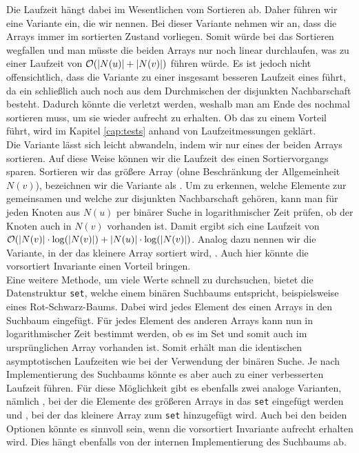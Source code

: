 Die Laufzeit hängt dabei im Wesentlichen vom Sortieren ab. Daher führen wir eine Variante ein, 
die wir  nennen. Bei dieser Variante nehmen wir an, dass
die Arrays immer im sortierten Zustand vorliegen. Somit würde bei \SorSor{} das Sortieren wegfallen
und man müsste die beiden Arrays nur noch linear durchlaufen, was zu einer Laufzeit von $\mathcal{O}(|N(u)| + |N(v)|)$
führen würde. 
Es ist jedoch nicht offensichtlich, dass die Variante zu einer insgesamt besseren Laufzeit eines
 führt, da ein \ct{} schließlich auch noch aus dem Durchmischen der disjunkten Nachbarschaft besteht.
Dadurch könnte die  verletzt werden, weshalb man am Ende des  nochmal sortieren
muss, um sie wieder aufrecht zu erhalten. Ob das  zu einem Vorteil führt, wird im Kapitel 
\ref{cap:tests} anhand von Laufzeitmessungen geklärt.
\\

Die Variante \SorSor{} lässt sich leicht abwandeln, indem wir nur eines der beiden Arrays sortieren.
Auf diese Weise können wir die Laufzeit des einen Sortiervorgangs sparen. Sortieren
wir das größere Array (ohne Beschränkung der Allgemeinheit $N(v)$), bezeichnen wir die Variante als \SorSea{}. Um zu erkennen, 
welche Elemente zur gemeinsamen und welche zur disjunkten Nachbarschaft gehören, kann man für jeden
Knoten aus $N(u)$ per binärer Suche in logarithmischer Zeit prüfen, ob der Knoten auch in $N(v)$ vorhanden ist.
Damit ergibt sich eine Laufzeit von $\mathcal{O}(|N(v)| \cdot \log(|N(v)|) + |N(u)| \cdot \log(|N(v)|)$. Analog dazu
nennen wir die Variante, in der das kleinere Array sortiert wird, \SeaSor. 
Auch hier könnte die vorsortiert Invariante einen Vorteil bringen.
\\

Eine weitere Methode, um viele Werte schnell zu durchsuchen, bietet die Datenstruktur \texttt{set}, welche
einem binären Suchbaums entspricht, beispielsweise eines Rot-Schwarz-Baums.
Dabei wird jedes Element des einen Arrays in den Suchbaum eingefügt. 
Für jedes Element des anderen Arrays kann nun in logarithmischer
Zeit bestimmt werden, ob es im Set und somit auch im ursprünglichen Array vorhanden ist.
Somit erhält man die identischen asymptotischen Laufzeiten wie bei der Verwendung der
binären Suche. Je nach Implementierung des Suchbaums könnte es aber auch zu einer verbesserten
Laufzeit führen. 
Für diese Möglichkeit gibt es ebenfalls zwei 
analoge Varianten, nämlich \SetSea, bei der die Elemente des größeren Arrays in das \texttt{set} eingefügt werden
und \SeaSet, bei der das kleinere Array zum \texttt{set} hinzugefügt wird.
Auch bei den beiden Optionen könnte es sinnvoll sein, wenn die vorsortiert Invariante aufrecht erhalten wird.
Dies hängt ebenfalls von der internen Implementierung des Suchbaums ab.
\\

